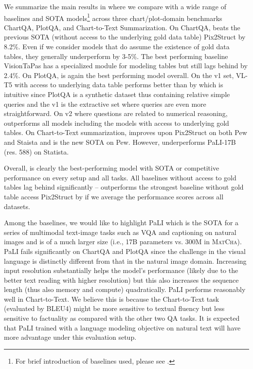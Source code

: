 We summarize the main results in  where we compare \model{} with a wide range of baselines and SOTA models\footnote{For brief introduction of baselines used, please see .} across three chart/plot-domain benchmarks ChartQA, PlotQA, and Chart-to-Text Summarization. On ChartQA, \model{} beats the previous SOTA (without access to the underlying gold data table) Pix2Struct by 8.2\%. Even if we consider models that do assume the existence of gold data tables, they generally underperform \model{} by 3-5\%. The best performing baseline VisionTaPas has a specialized module for modeling tables but still lags behind \model{} by 2.4\%. On PlotQA, \model{} is again the best performing model overall. On the v1 set, VL-T5 with access to underlying data table performs better than \model{} by  which is intuitive since PlotQA is a synthetic dataset thus containing relative simple queries and the v1 is the extractive set where queries are even more straightforward. On v2 where questions are related to numerical reasoning, \model{} outperforms all models including the models with access to underlying gold tables.  On Chart-to-Text summarization, \model{} improves upon Pix2Struct on both Pew and Staista and is the new SOTA on Pew. However, \model{} underperforms PaLI-17B (res. 588) on Statista.

Overall, \model{} is clearly the best-performing model with SOTA or competitive performance on every setup and all tasks. All baselines without access to gold tables lag behind significantly -- \model{} outperforms the strongest baseline without gold table access Pix2Struct by  if we average the performance scores across all datasets.

Among the baselines, we would like to highlight PaLI which is the SOTA for a series of multimodal text-image tasks such as VQA and captioning on natural images and is of a much larger size (i.e., 17B parameters vs. 300M in \textsc{MatCha}). PaLI fails significantly on ChartQA and PlotQA since the challenge in the visual language is distinctly different from that in the natural image domain. Increasing input resolution substantially helps the model's performance (likely due to the better text reading with higher resolution) but this also increases the sequence length (thus also memory and compute) quadratically. PaLI performs reasonably well in Chart-to-Text. We believe this is because the Chart-to-Text task (evaluated by BLEU4) might be more sensitive to textual fluency but less sensitive to factuality as compared with the other two QA tasks. It is expected that PaLI trained with a language modeling objective on natural text will have more advantage under this evaluation setup. 



